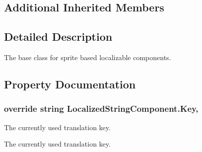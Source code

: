 \subsection*{Additional Inherited Members}


\subsection{Detailed Description}
The base class for sprite based localizable components. 



\subsection{Property Documentation}
\subsubsection[{\texorpdfstring{Key}{Key}}]{\setlength{\rightskip}{0pt plus 5cm}override string Localized\+String\+Component.\+Key\hspace{0.3cm}{\ttfamily [get]}, {\ttfamily [set]}}\hypertarget{class_localized_string_component_a20a4bce753bc30c60383463a8556051c}{}\label{class_localized_string_component_a20a4bce753bc30c60383463a8556051c}


The currently used translation key. 

The currently used translation key.
